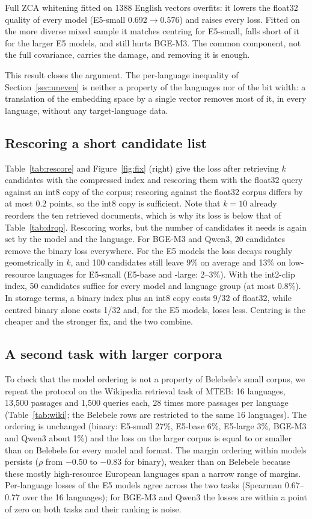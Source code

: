 \documentclass[10pt]{article}
\begin{document}
Full ZCA whitening fitted on 1388 English vectors overfits: it lowers the float32 quality of every model (E5-small 0.692$\to$0.576) and raises every loss. Fitted on the more diverse mixed sample it matches centring for E5-small, falls short of it for the larger E5 models, and still hurts BGE-M3. The common component, not the full covariance, carries the damage, and removing it is enough.

This result closes the argument. The per-language inequality of Section~\ref{sec:uneven} is neither a property of the languages nor of the bit width: a translation of the embedding space by a single vector removes most of it, in every language, without any target-language data.

\subsection{Rescoring a short candidate list}\label{sec:rescore}

Table~\ref{tab:rescore} and Figure~\ref{fig:fix} (right) give the loss after retrieving $k$ candidates with the compressed index and rescoring them with the float32 query against an int8 copy of the corpus; rescoring against the float32 corpus differs by at most 0.2 points, so the int8 copy is sufficient. Note that $k=10$ already reorders the ten retrieved documents, which is why its loss is below that of Table~\ref{tab:drop}. Rescoring works, but the number of candidates it needs is again set by the model and the language. For BGE-M3 and Qwen3, 20 candidates remove the binary loss everywhere. For the E5 models the loss decays roughly geometrically in $k$, and 100 candidates still leave 9\% on average and 13\% on low-resource languages for E5-small (E5-base and -large: 2--3\%). With the int2-clip index, 50 candidates suffice for every model and language group (at most 0.8\%). In storage terms, a binary index plus an int8 copy costs 9/32 of float32, while centred binary alone costs 1/32 and, for the E5 models, loses less. Centring is the cheaper and the stronger fix, and the two combine.

\subsection{A second task with larger corpora}\label{sec:wiki}

To check that the model ordering is not a property of Belebele's small corpus, we repeat the protocol on the Wikipedia retrieval task of MTEB: 16 languages, 13{,}500 passages and 1{,}500 queries each, 28 times more passages per language (Table~\ref{tab:wiki}; the Belebele rows are restricted to the same 16 languages). The ordering is unchanged (binary: E5-small 27\%, E5-base 6\%, E5-large 3\%, BGE-M3 and Qwen3 about 1\%) and the loss on the larger corpus is equal to or smaller than on Belebele for every model and format. The margin ordering within models persists ($\rho$ from $-0.50$ to $-0.83$ for binary), weaker than on Belebele because these mostly high-resource European languages span a narrow range of margins. Per-language losses of the E5 models agree across the two tasks (Spearman 0.67--0.77 over the 16 languages); for BGE-M3 and Qwen3 the losses are within a point of zero on both tasks and their ranking is noise.
\end{document}
